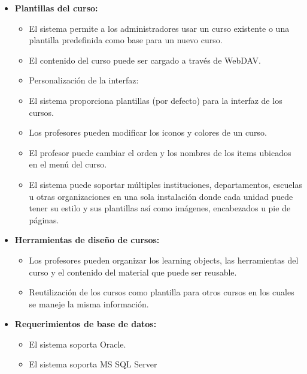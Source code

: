 	\begin{itemize}
		\item \textbf{Plantillas del curso:}
			\begin{itemize}
				\item El sistema permite a los administradores usar un curso existente o una plantilla predefinida como base para un nuevo curso.
				\item El contenido del curso puede ser cargado a través de WebDAV.
				\item Personalización de la interfaz:
				\item El sistema proporciona plantillas (por defecto) para la interfaz de los cursos.
				\item Los profesores pueden modificar los iconos y colores de un curso.
				\item El profesor puede cambiar el orden y los nombres de los items ubicados en el menú del curso.
				\item El sistema puede soportar múltiples instituciones, departamentos, escuelas u otras organizaciones en una sola instalación donde cada unidad puede tener su estilo y sus plantillas así como imágenes, encabezados u pie de páginas.
			\end{itemize}
	\end{itemize}
	\begin{itemize}
		\item \textbf{Herramientas de diseño de cursos:}
			\begin{itemize}
				\item Los profesores pueden organizar los learning objects, las herramientas del curso y el contenido del material que puede ser reusable.
				\item Reutilización de los cursos como plantilla para otros cursos en los cuales se maneje la misma información.
			\end{itemize}
	\end{itemize}
	\begin{itemize}
		\item \textbf{Requerimientos de base de datos:}
			\begin{itemize}
				\item El sistema soporta Oracle.
				\item El sistema soporta MS SQL Server
			\end{itemize}
	\end{itemize}
